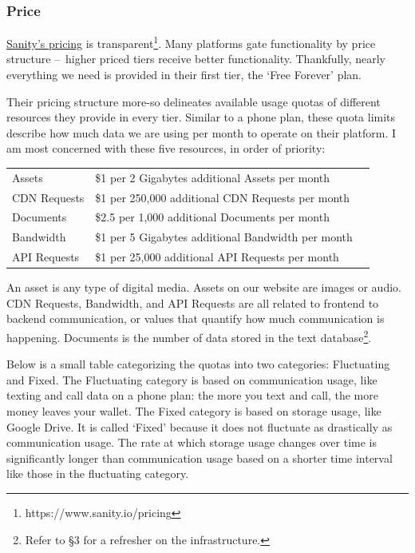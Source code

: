 \subsubsection*{Price}
\href{https://www.sanity.io/pricing}{Sanity's pricing} is transparent\footnote{https://www.sanity.io/pricing}. Many platforms gate functionality by price structure – higher priced tiers receive better functionality. Thankfully, nearly everything we need is provided in their first tier, the `Free Forever' plan.

Their pricing structure more-so delineates available usage quotas of different resources they provide in every tier. Similar to a phone plan, these quota limits describe how much data we are using per month to operate on their platform. I am most concerned with these five resources, in order of priority:

\begin{table}[H]
    \setlength{\tabcolsep}{10pt} %
    \renewcommand{\arraystretch}{1.5} %
    \begin{tabular}{ l l c }
        Assets & \$1 per 2 Gigabytes additional Assets per month\\
        CDN Requests & \$1 per 250,000 additional CDN Requests per month\\
        Documents & \$2.5 per 1,000 additional Documents per month\\
        Bandwidth & \$1 per 5 Gigabytes additional Bandwidth per month\\
        API Requests & \$1 per 25,000 additional API Requests per month\\
    \end{tabular}
\end{table}

An asset is any type of digital media. Assets on our website are images or audio. CDN Requests, Bandwidth, and API Requests are all related to frontend to backend communication, or values that quantify how much communication is happening. Documents is the number of data stored in the text database\footnote{Refer to §3 for a refresher on the infrastructure.}.

Below is a small table categorizing the quotas into two categories: Fluctuating and Fixed. The Fluctuating category is based on communication usage, like texting and call data on a phone plan: the more you text and call, the more money leaves your wallet. The Fixed category is based on storage usage, like Google Drive. It is called `Fixed' because it does not fluctuate as drastically as communication usage. The rate at which storage usage changes over time is significantly longer than communication usage based on a shorter time interval like those in the fluctuating category.

